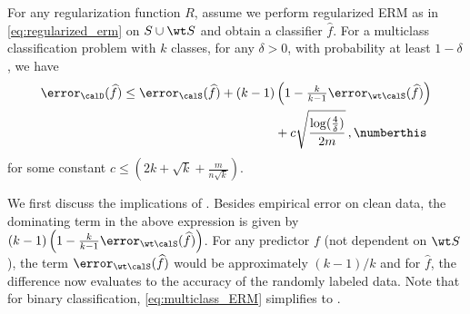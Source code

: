 \begin{theorem} \label{thm:multiclass_ERM}
    For any regularization function $R$, 
    assume we perform regularized ERM 
    as in \eqref{eq:regularized_erm} on $S \cup \wt S$ 
    and obtain a classifier $\widehat f$. 
    For a multiclass classification problem 
    with $k$ classes,
    for any $\delta >0$, with probability at least $1-\delta$,
    we have
    \vspace{-10pt}
    \begin{align*}
        \error_\calD(\widehat f)  \le \error_\calS(\widehat f)  + (k-1) &\left(1 - \tfrac{k}{k-1} \error_{\wt\calS}(\widehat f)\right) \\
        &+ c\sqrt{\frac{\log(\frac{4}{\delta})}{2m}} \,,\numberthis \label{eq:multiclass_ERM}
    \end{align*}
    for some constant $c \le (2k+\sqrt{k} + \frac{m}{n\sqrt{k}})$.
\end{theorem}


We first discuss the implications of .
Besides empirical error on clean data, the dominating term in
the above expression
is given by $(k-1)\left(1 - \frac{k}{k-1} \error_{\wt\calS}(\widehat f)\right)$.  
For any predictor $f$ 
(not dependent on $\wt S$), 
the term $\error_{\wt\calS}(\widehat f)$ 
would be approximately $(k-1)/{k}$ 
and for $\widehat f$, 
the difference now evaluates to the accuracy 
of the randomly labeled data.  
Note that for binary classification, 
\eqref{eq:multiclass_ERM} 
simplifies to 
. 

